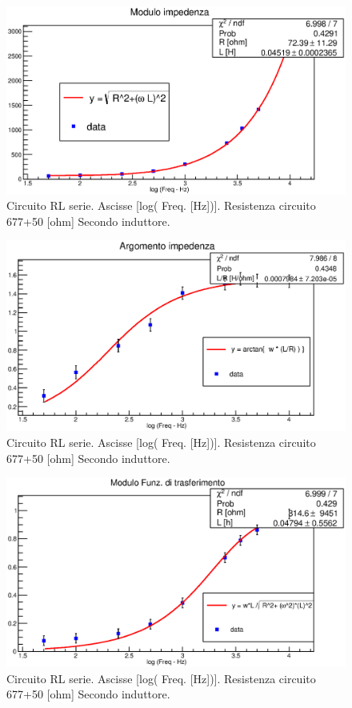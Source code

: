 \begin{figure}[H]
\centering
\includegraphics[scale=0.7]{Grafici/C3_P1_ModImp_ind2.eps}
\caption{
Circuito RL serie.
Ascisse [log( Freq. [Hz])].
Resistenza circuito 677+50 [ohm]
Secondo induttore.
}
\label{fig:C3_P1_ModImp_ind2}
\end{figure}

\begin{figure}[H]
\centering
\includegraphics[scale=0.7]{Grafici/C3_P1_ArgImp_ind2.eps}
\caption{
Circuito RL serie.
Ascisse [log( Freq. [Hz])].
Resistenza circuito 677+50 [ohm]
Secondo induttore.
}
\label{fig:C3_P1_ArgImp_ind2}
\end{figure}

\begin{figure}[H]
\centering
\includegraphics[scale=0.7]{Grafici/C3_P1_ModFdT_ind2.eps}
\caption{
Circuito RL serie.
Ascisse [log( Freq. [Hz])].
Resistenza circuito 677+50 [ohm]
Secondo induttore.
}
\label{fig:C3_P1_ModFdT_ind2}
\end{figure}

